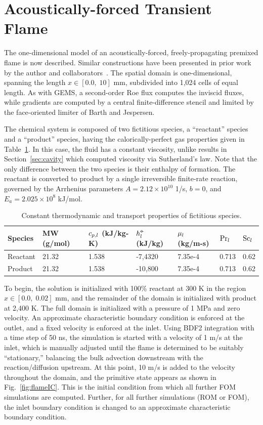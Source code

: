 \section{Acoustically-forced Transient Flame}\label{sec:oneDFlame}

The one-dimensional model of an acoustically-forced, freely-propagating premixed flame is now described. Similar constructions have been presented in prior work by the author and collaborators~\cite{Huang2022,Wentland2019}. The spatial domain is one-dimensional, spanning the length $x \in [0.0, \; 10]$ mm, subdivided into 1,024 cells of equal length. As with GEMS, a second-order Roe flux computes the inviscid fluxes, while gradients are computed by a central finite-difference stencil and limited by the face-oriented limiter of Barth and Jespersen.

The chemical system is composed of two fictitious species, a ``reactant'' species and a ``product'' species, having the calorically-perfect gas properties given in Table~\ref{tab:oneDFlameSpecs}. In this case, the fluid has a constant viscosity, unlike results in Section~\ref{sec:cavity} which computed viscosity via Sutherland's law. Note that the only difference between the two species is their enthalpy of formation. The reactant is converted to product by a single irreversible finite-rate reaction, governed by the Arrhenius parameters $A = 2.12 \times 10^{10}$ 1/s, $b = 0$, and $E_a = 2.025 \times 10^{8}$ kJ/mol.

\begin{table}
	\centering
	\begin{tabular}{ lllllll }
	\toprule
	Species & MW (g/mol) & $c_{p,l}$ (kJ/kg-K) & $h^{\circ\kern-0.47em-}_{l}$ (kJ/kg) & $\mu_{l}$ (kg/m-s) & $\text{Pr}_{l}$ & $\text{Sc}_{l}$   \\
	\midrule
	Reactant & 21.32 & 1.538 & -7,4320 & 7.35e-4 & 0.713 & 0.62 \\
	Product & 21.32 & 1.538 & -10,800 & 7.35e-4 & 0.713 & 0.62 \\
	\bottomrule
	\end{tabular}
	\caption{\label{tab:oneDFlameSpecs}Constant thermodynamic and transport properties of fictitious species.}
\end{table}

To begin, the solution is initialized with 100\% reactant at 300 K in the region $x \in [0.0, \; 0.02]$ mm, and the remainder of the domain is initialized with product at 2,400 K. The full domain is initialized with a pressure of 1 MPa and zero velocity. An approximate characteristic boundary condition is enforced at the outlet, and a fixed velocity is enforced at the inlet. Using BDF2 integration with a time step of 50 ns, the simulation is started with a velocity of 1 m/s at the inlet, which is manually adjusted until the flame is determined to be suitably ``stationary,'' balancing the bulk advection downstream with the reaction/diffusion upstream. At this point, 10 m/s is added to the velocity throughout the domain, and the primitive state appears as shown in Fig.~\ref{fig:flameIC}. This is the initial condition from which all further FOM simulations are computed. Further, for all further simulations (ROM or FOM), the inlet boundary condition is changed to an approximate characteristic boundary condition.

